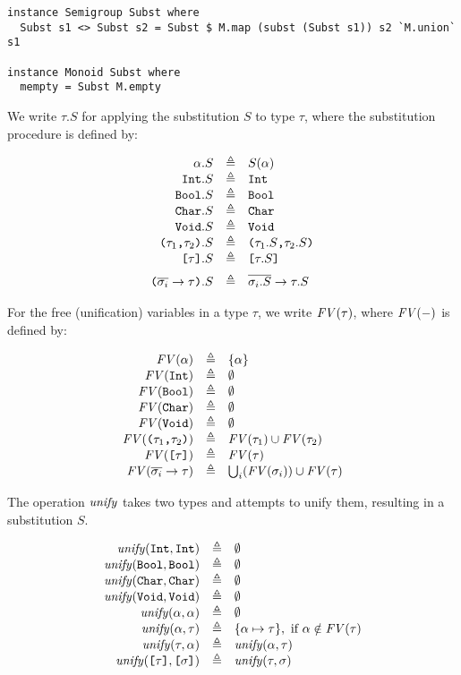 \begin{verbatim}
instance Semigroup Subst where
  Subst s1 <> Subst s2 = Subst $ M.map (subst (Subst s1)) s2 `M.union` s1

instance Monoid Subst where
  mempty = Subst M.empty
\end{verbatim}

We write $\tau.S$ for applying the substitution $S$ to type $\tau$, where the
substitution procedure is defined by:

\[
\begin{array}{rcl}
  \alpha.S & \eqdef & S(\alpha) \\
  \Int.S & \eqdef & \Int \\
  \Bool.S & \eqdef & \Bool \\
  \Char.S & \eqdef & \Char \\
  \Void.S & \eqdef & \Void \\
  \TProd{\tau_1}{\tau_2}.S & \eqdef & \TProd{\tau_1.S}{\tau_2.S} \\
  \TList{\tau}.S & \eqdef & \TList{\tau.S} \br
  \Parens{ \TFun{\set{\sigma_i}}{\tau} }.S & \eqdef & \TFun{\set{\sigma_i.S}}{\tau.S}
\end{array}
\]

For the free (unification) variables in a type $\tau$, we write $\mathit{FV}(\tau)$, where
$\mathit{FV}(-)$ is defined by:

\[
\begin{array}{rcl}
  \mathit{FV}(\alpha) & \triangleq & \{ \alpha \} \\
  \mathit{FV}(\texttt{Int}) & \triangleq & \emptyset \\
  \mathit{FV}(\texttt{Bool}) & \triangleq & \emptyset \\
  \mathit{FV}(\texttt{Char}) & \triangleq & \emptyset \\
  \mathit{FV}(\texttt{Void}) & \triangleq & \emptyset \\
  \mathit{FV}( \texttt{(}\tau_1\texttt{,}\tau_2\texttt{)} ) & \triangleq & \mathit{FV}(\tau_1) \cup \mathit{FV}(\tau_2) \\
  \mathit{FV}( \texttt{[}\tau\texttt{]} ) & \triangleq & \mathit{FV}(\tau) \\
  \mathit{FV}( \overline{\sigma_i} \to \tau ) & \triangleq & \bigcup_i(\mathit{FV}(\sigma_i)) \cup \mathit{FV}(\tau)
\end{array}
\]

The operation $\mathit{unify}$ takes two types and attempts to unify them, resulting in
a substitution $S$.

\[
\begin{array}{rcl}
  \mathit{unify}(\texttt{Int},\texttt{Int}) & \triangleq & \emptyset \\
  \mathit{unify}(\texttt{Bool},\texttt{Bool}) & \triangleq & \emptyset \\
  \mathit{unify}(\texttt{Char},\texttt{Char}) & \triangleq & \emptyset \\
  \mathit{unify}(\texttt{Void},\texttt{Void}) & \triangleq & \emptyset \\
  \mathit{unify}(\alpha,\alpha) & \triangleq & \emptyset \\
  \mathit{unify}(\alpha,\tau) & \triangleq &
    \{ \alpha \mapsto \tau \},\ \text{if}\ \alpha \notin \mathit{FV}(\tau) \\
  \mathit{unify}(\tau,\alpha) & \triangleq & \mathit{unify}(\alpha,\tau) \\
  \mathit{unify}(\texttt{[}\tau\texttt{]},\texttt{[}\sigma\texttt{]}) & \triangleq & \mathit{unify}(\tau,\sigma)
\end{array}
\]

